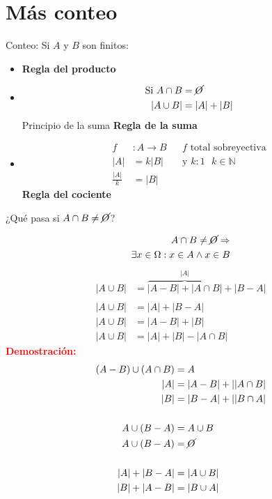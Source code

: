 \documentclass[../main.tex]{subfiles}
\begin{document}
\chapter{Más conteo}%

\thispagestyle{fancy}

Conteo: Si $A$ y $B$ son finitos:
\begin{itemize}
	\item {} \textbf{Regla del producto}
	\item \dobledef
		{
			\begin{align*}
				\text{Si }A\cap B &= \cancel{O}\\
				|A\cup B| &= |A|+|B|
			\end{align*}
		}
		{Principio de la suma} \textbf{Regla de la suma}
	\item
		\begin{align*}
			f&:A \longrightarrow B && \text{$f$ total sobreyectiva}\\
			|A| &= k|B| && \text{y $k:1$ $k\in\mathbb{N}$}\\
			\frac{|A|}{k} &= |B|
		\end{align*}
		\textbf{Regla del cociente}
\end{itemize}

¿Qué pasa si $A\cap B \neq \cancel{O}$?

\textcolor{red}
{
	\begin{align*}
		A\cap B \neq \cancel{O} \Rightarrow\\
		\exists x \in \Omega:x\in A \wedge x \in B
	\end{align*}
}
\begin{align*}
	|A\cup B| &= \overbrace{|A-B|+|A\cap B|}^{|A|}+|B-A|\\
	\\
	|A\cup B| &= |A| + |B-A|\\
	|A\cup B| &= |A-B|+|B|\\
	|A\cup B| &= |A|+|B|- |A\cap B|
\end{align*}
\textbf{\textcolor{red}{Demostración:}}
\begin{align*}
	(A-B)\cup(A\cap B) &= A\\
	|A| &= |A-B|+||A\cap B|\\
	|B| &= |B-A|+||B\cap A|\\
	\\
	A\cup(B-A) &= A\cup B\\
	A\cup(B-A) &= \cancel{O}\\
	\\
	|A|+|B-A| &= |A\cup B|\\
	|B|+|A-B| &= |B\cup A|
\end{align*}
\end{document}
